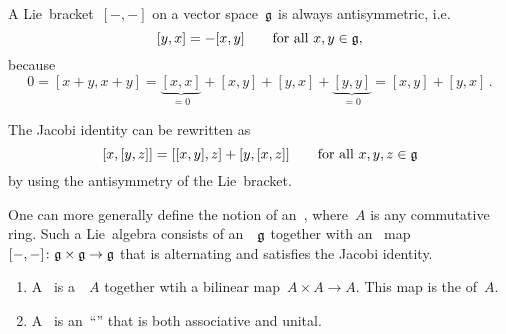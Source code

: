 \begin{remark}
  A Lie~bracket~$[-, -]$ on a vector space~$\mathfrak{g}$ is always antisymmetric, i.e.
  \[
    [y,x] = -[x,y]
    \qquad
    \text{for all~$x, y \in \mathfrak{g}$,}
  \]
  because
  \[
    0
    =
    [x+y, x+y]
    =
      \underbrace{ [x,x] }_{= 0}
    + [x,y]
    + [y,x]
    + \underbrace{ [y,y] }_{= 0}
    =
    [x,y] + [y,x] \,.
  \]
\end{remark}


\begin{remark}
  The Jacobi identity can be rewritten as
  \[
    [x,[y,z]]
    =
    [[x,y],z] + [y,[x,z]]
    \qquad
    \text{for all~$x, y, z \in \mathfrak{g}$}
  \]
  by using the antisymmetry of the Lie~bracket.
\end{remark}


\begin{remark}
  One can more generally define the notion of an~, where~$A$ is any commutative ring.
  Such a Lie~algebra consists of an~~$\mathfrak{g}$ together with an~ map~$[-,-] \colon \glie \times \glie \to \glie$ that is alternating and satisfies the Jacobi identity.
\end{remark}


\begin{definition}
  \leavevmode
  \begin{enumerate}
    \item
      A~ is a~\vectorspace{$\kf$}~$A$ together wtih a bilinear map~$A \times A \to A$.
      This map is the  of~$A$.
    \item
      A~ is an~\enquote{\algebra{$\kf$}} that is both associative and unital.
  \end{enumerate}
\end{definition}

